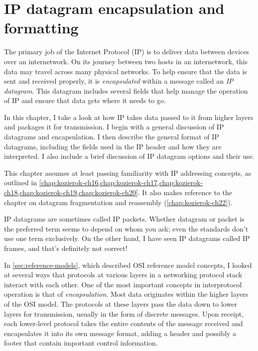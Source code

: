 \chapter{IP datagram encapsulation and formatting}
\label{chap:kozierok-ch21}


The primary job of the Internet Protocol (IP) is to deliver data between
devices over an internetwork. On its journey between two hosts in an
internetwork, this data may travel across many physical networks. To
help ensure that the data is sent and received properly, it is
{\emph{encapsulated}} within a message called an {\emph{IP datagram}}.
This datagram includes several fields that help manage the operation of
IP and ensure that data gets where it needs to go.

In this chapter, I take a look at how IP takes data passed to it from
higher layers and packages it for transmission. I begin with a general
discussion of IP datagrams and encapsulation. I then describe the
general format of IP datagrams, including the fields used in the IP
header and how they are interpreted. I also include a brief discussion
of IP datagram options and their use.


\begin{backgroundinfo}
This chapter assumes at least passing familiarity with IP addressing concepts, as outlined in
\cref{chap:kozierok-ch16,chap:kozierok-ch17,chap:kozierok-ch18,chap:kozierok-ch19,chap:kozierok-ch20}.
It also makes reference to the chapter on datagram fragmentation and reassembly (\cref{chap:kozierok-ch22}).
\end{backgroundinfo}


\begin{note}
IP datagrams are sometimes called IP packets.
Whether datagram or packet is the preferred term seems to depend on whom you ask; even the standards don't use one term exclusively.
On the other hand, I have seen IP datagrams called IP frames, and that's definitely not correct!
\end{note}


In \cref{sec:reference-models}, which described OSI reference model concepts, I looked at several ways that protocols at various
layers in a networking protocol stack interact with each other.
One of the most important concepts in interprotocol operation is that of \emph{encapsulation}.
Most data originates within the higher layers of the OSI model.
The protocols at these layers pass the data down to lower layers for transmission, usually in the form of discrete messages.
Upon receipt, each lower-level protocol takes the entire contents of the message received and encapsulates it into its own message format, adding
a header and possibly a footer that contain important control information.

